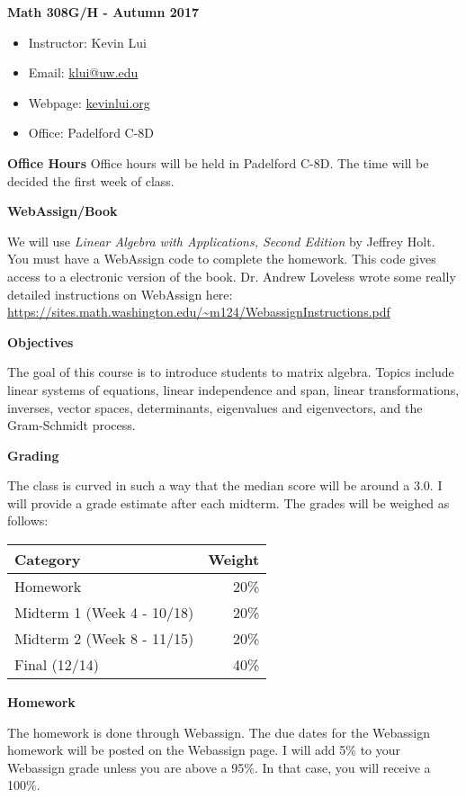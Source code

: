 \documentclass{article}
\begin{document}
\textbf{\huge  Math 308G/H - Autumn 2017 }
\begin{itemize}
    \item
        Instructor: Kevin Lui
    \item
        Email: \href{mailto:klui@uw.edu}{klui@uw.edu}
    \item
        Webpage: \url{kevinlui.org}
    \item
        Office: Padelford C-8D
\end{itemize}

\textbf{Office Hours}
Office hours will be held in Padelford C-8D. The time will be decided the first
week of class.

\textbf{WebAssign/Book}

We will use \textit{Linear Algebra with Applications, Second Edition} by
Jeffrey Holt. You must have a WebAssign code to complete the homework. This
code gives access to a electronic version of the book. Dr. Andrew Loveless
wrote some really detailed instructions on WebAssign here:
\url{https://sites.math.washington.edu/~m124/WebassignInstructions.pdf}

\textbf{Objectives}

The goal of this course is to introduce students to matrix algebra. Topics
include linear systems of equations, linear independence and span, linear
transformations, inverses, vector spaces, determinants, eigenvalues and
eigenvectors, and the Gram-Schmidt process.

\textbf{Grading}

The class is curved in such a way that the median score will be around a 3.0. I
will provide a grade estimate after each midterm.  The grades will be weighed
as follows:

\begin{tabular}{ l r }
    Category  & Weight   \\
    \hline
    Homework  & 20\%      \\
    Midterm 1 (Week 4 - 10/18) & 20\%      \\
    Midterm 2 (Week 8 - 11/15) & 20\%      \\
    Final (12/14)    & 40\%
\end{tabular}

\textbf{Homework}

The homework is done through Webassign. The due dates for the Webassign
homework will be posted on the Webassign page. I will add 5\% to your
Webassign grade unless you are above a 95\%. In that case, you will receive a
100\%.
\end{document}

